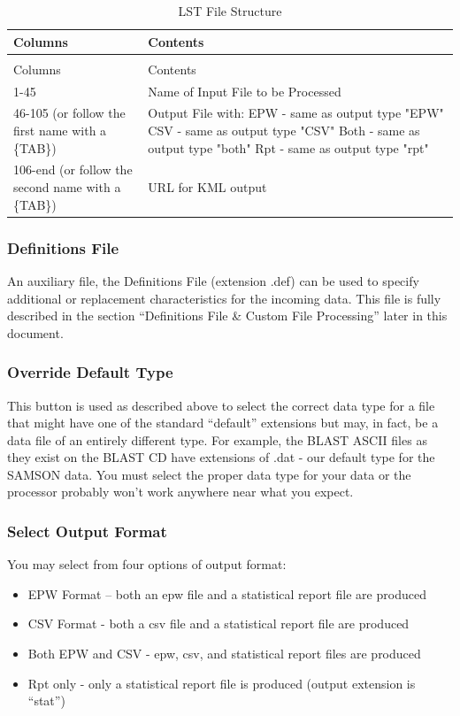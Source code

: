 \begin{longtable}[c]{p{1.52in}p{4.47in}}
\caption{LST File Structure \label{table:lst-file-structure}} \tabularnewline
\toprule 
Columns & Contents \tabularnewline
\midrule
\endfirsthead

\caption[]{LST File Structure} \tabularnewline
\toprule 
Columns & Contents \tabularnewline
\midrule
\endhead

1-45 & Name of Input File to be Processed \tabularnewline
46-105 (or follow the first name with a \{TAB\}) & Output File with: EPW - same as output type "EPW" CSV - same as output type "CSV" Both - same as output type "both" Rpt - same as output type "rpt" \tabularnewline
106-end (or follow the second name with a \{TAB\}) & URL for KML output \tabularnewline
\bottomrule
\end{longtable}

\subsubsection{Definitions File}\label{definitions-file}

An auxiliary file, the Definitions File (extension .def) can be used to specify additional or replacement characteristics for the incoming data. This file is fully described in the section ``Definitions File \& Custom File Processing'' later in this document.

\subsubsection{Override Default Type}\label{override-default-type}

This button is used as described above to select the correct data type for a file that might have one of the standard ``default'' extensions but may, in fact, be a data file of an entirely different type. For example, the BLAST ASCII files as they exist on the BLAST CD have extensions of .dat - our default type for the SAMSON data. You must select the proper data type for your data or the processor probably won't work anywhere near what you expect.

\subsubsection{Select Output Format}\label{select-output-format}

You may select from four options of output format:

\begin{itemize}
\item
  EPW Format -- both an epw file and a statistical report file are produced
\item
  CSV Format - both a csv file and a statistical report file are produced
\item
  Both EPW and CSV - epw, csv, and statistical report files are produced
\item
  Rpt only - only a statistical report file is produced (output extension is ``stat'')
\end{itemize}

